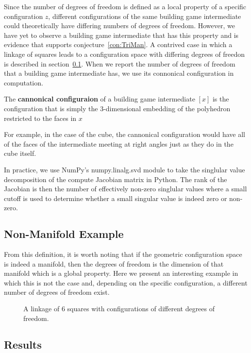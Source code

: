 Since the number of degrees of freedom is defined as a local property of a specific configuration $z$, different configurations of the same building game intermediate could theoretically have differing numbers of degrees of freedom. However, we have yet to observe a building game intermediate that has this property and is evidence that supports conjecture~\ref{con:TriMan}. A contrived case in which a linkage of squares leads to a configuration space with differing degrees of freedon is described in section~\ref{ssc:NonMan}. When we report the number of degrees of freedom that a building game intermediate has, we use its connonical configuration in computation.
\begin{mydef}
The \textbf{cannonical configuraion} of a building game intermediate $[x]$ is the configuration that is simply the $3$-dimensional embedding of the polyhedron restricted to the faces in $x$
\end{mydef}
For example, in the case of the cube, the cannonical configuration would have all of the faces of the intermediate  meeting at right angles just as they do in the cube itself. 

In practice, we use NumPy's numpy.linalg.svd module to take the singlular value decomposition of the compute Jacobian matrix in Python. The rank of the Jacobian is then the number of effectively non-zero singlular values where a small cutoff is used to determine whether a small singular value is indeed zero or non-zero.

\subsection{Non-Manifold Example}
\label{ssc:NonMan}
From this definition, it is worth noting that if the geometric configuration space is indeed a manifold, then the degrees of freedom is the dimension of that manifold which is a global property. Here we present an interesting example in which this is not the case and, depending on the specific configuration, a different number of degrees of freedom exist.

\begin{figure}[ht]
\caption{A linkage of 6 squares with configurations of different degrees of freedom.}
\label{fig:SixSq}
\end{figure}


\subsection{Results}

